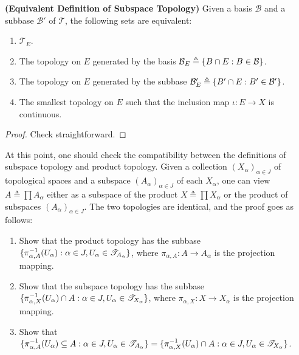 \documentclass{report}
\begin{document}
\begin{theorem}
\textbf{(Equivalent Definition of Subspace Topology)} Given a basis $\mathcal{B}$ and a subbase $\mathcal{B}'$ of $\mathscr{T}$, the following sets are equivalent:
\begin{enumerate}[label=(\alph*)]
    \item $\mathscr{T}_E$. 
    \item The topology on $E$ generated by the basis $\mathcal{B}_E \triangleq \{ B \cap E : B \in \mathcal{B} \}$. 
    \item The topology on $E$ generated by the subbase $\mathcal{B}'_E \triangleq \{ B' \cap E : B' \in \mathcal{B}' \}$. 
    \item The smallest topology on $E$ such that the inclusion map $\iota : E \to X$ is continuous.
\end{enumerate}
\end{theorem}

\begin{proof}
Check straightforward.
\end{proof}
\begin{mdframed}
At this point, one should check the compatibility between the definitions of subspace topology and product topology. Given a collection $(X_\alpha)_{\alpha \in J}$ of topological spaces and a subspace $(A_\alpha)_{\alpha \in J}$ of each $X_\alpha$, one can view $A \triangleq \prod A_\alpha$ either as a subspace of the product $X \triangleq \prod X_\alpha$ or the product of subspaces $(A_\alpha)_{\alpha \in J}$. The two topologies are identical, and the proof goes as follows:
\begin{enumerate}[label=(\alph*)]
    \item Show that the product topology has the subbase $\{ \pi_{\alpha,A}^{-1}(U_\alpha) : \alpha \in J, U_\alpha \in \mathscr{T}_{A_\alpha} \}$, where $\pi_{\alpha,A} : A \to A_\alpha$ is the projection mapping.
    \item Show that the subspace topology has the subbase $\{ \pi_{\alpha,X}^{-1}(U_\alpha) \cap A : \alpha \in J, U_\alpha \in \mathscr{T}_{X_\alpha} \}$, where $\pi_{\alpha,X} : X \to X_\alpha$ is the projection mapping.
    \item Show that $\{ \pi_{\alpha,A}^{-1}(U_\alpha) \subseteq A : \alpha \in J, U_\alpha \in \mathscr{T}_{A_\alpha} \} = \{ \pi_{\alpha,X}^{-1}(U_\alpha) \cap A : \alpha \in J, U_\alpha \in \mathscr{T}_{X_\alpha} \}$.
\end{enumerate}
\end{mdframed}
\end{document}
